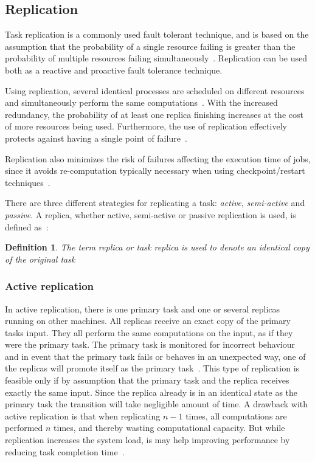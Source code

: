 \documentclass{cslthse-msc}
\newtheorem{definition}{Definition}[chapter]
\begin{document}
\subsection{Replication} \label{subsec:background_replication}
Task replication is a commonly used fault tolerant technique, and is based on the assumption that the probability of a single resource failing is greater than the probability of multiple resources failing simultaneously~\cite{faultToleranceGrid}. Replication can be used both as a reactive and proactive fault tolerance technique.

Using replication, several identical processes are scheduled on different resources and simultaneously perform the same computations~\cite{relGridSystems}. With the increased redundancy, the probability of at least one replica finishing increases at the cost of more resources being used. Furthermore, the use of replication effectively protects against having a single point of failure~\cite{faultToleranceGrid}.

Replication also minimizes the risk of failures affecting the execution time of jobs, since it avoids re-computation typically necessary when using checkpoint/restart techniques~\cite{designFaultTolerantSched}.

There are three different strategies for replicating a task: \emph{active}, \emph{semi-active} and \emph{passive}. A replica, whether active, semi-active or passive replication is used, is defined as~\cite{effTaskReplMobGrid}:
\begin{definition} \label{def:replica}
The term replica or task replica is used to denote an identical copy of the original task
\end{definition}

\subsubsection{Active replication} \label{subsec:active_replication}
In active replication, there is one primary task and one or several replicas running on other machines. All replicas receive an exact copy of the primary tasks input. They all perform the same computations on the input, as if they were the primary task. The primary task is monitored for incorrect behaviour and in event that the primary task fails or behaves in an unexpected way, one of the replicas will promote itself as the primary task~\cite{surveyFaultParallel}. This type of replication is feasible only if by assumption that the primary task and the replica receives exactly the same input. Since the replica already is in an identical state as the primary task the transition will take negligible amount of time. A drawback with active replication is that when replicating $n-1$ times, all computations are performed $n$ times, and thereby wasting computational capacity. But while replication increases the system load, is may help improving performance by reducing task completion time~\cite{improvingPerformanceReplication}.
\end{document}

